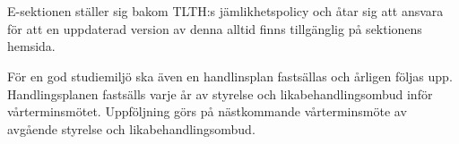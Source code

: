\documentclass[10pt]{article}
\begin{document}
\section*{\doctitle}
E-sektionen ställer sig bakom TLTH:s jämlikhetspolicy och åtar sig att ansvara för att en uppdaterad version av denna alltid finns tillgänglig på sektionens hemsida.

För en god studiemiljö ska även en handlinsplan fastsällas och årligen följas upp. Handlingsplanen fastsälls varje år av styrelse och likabehandlingsombud inför vårterminsmötet. Uppföljning görs på nästkommande vårterminsmöte av avgående styrelse och likabehandlingsombud.
\end{document}

